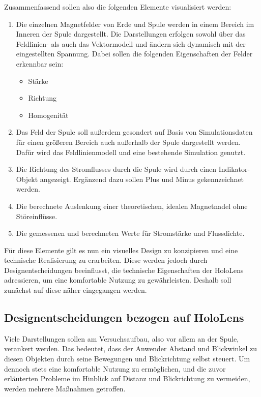 Zusammenfassend sollen also die folgenden Elemente visualisiert werden:
\begin{enumerate}
	\item Die einzelnen Magnetfelder von Erde und Spule werden in einem Bereich im Inneren der Spule dargestellt. Die Darstellungen erfolgen sowohl über das Feldlinien- als auch das Vektormodell und ändern sich dynamisch mit der eingestellten Spannung. Dabei sollen die folgenden Eigenschaften der Felder erkennbar sein:
	\begin{itemize}[topsep=-0.25em]
		\setlength{\itemsep}{-0.25em}
		\item Stärke
		\item Richtung
		\item Homogenität
	\end{itemize}
	\item Das Feld der Spule soll außerdem gesondert auf Basis von Simulationsdaten für einen größeren Bereich auch außerhalb der Spule dargestellt werden. Dafür wird das Feldlinienmodell und eine bestehende Simulation genutzt.
	\item Die Richtung des Stromflusses durch die Spule wird durch einen Indikator-Objekt angezeigt. Ergänzend dazu sollen Plus und Minus gekennzeichnet werden.
	\item Die berechnete Auslenkung einer theoretischen, idealen Magnetnadel ohne Störeinflüsse. 
	\item Die gemessenen und berechneten Werte für Stromstärke und Flussdichte.
\end{enumerate}
\vspace{6px}

Für diese Elemente gilt es nun ein visuelles Design zu konzipieren und eine technische Realisierung zu erarbeiten. Diese werden jedoch durch Designentscheidungen beeinflusst, die technische Eigenschaften der HoloLens adressieren, um eine komfortable Nutzung zu gewährleisten. Deshalb soll zunächst auf diese näher eingegangen werden.

\subsection{Designentscheidungen bezogen auf HoloLens}
\label{sec-4-2}
Viele Darstellungen sollen am Versuchsaufbau, also vor allem an der Spule, verankert werden. Das bedeutet, dass der Anwender Abstand und Blickwinkel zu diesen Objekten durch seine Bewegungen und Blickrichtung selbst steuert. Um dennoch stets eine komfortable Nutzung zu ermöglichen, und die zuvor erläuterten Probleme im Hinblick auf Distanz und Blickrichtung zu vermeiden, werden mehrere Maßnahmen getroffen.\\


